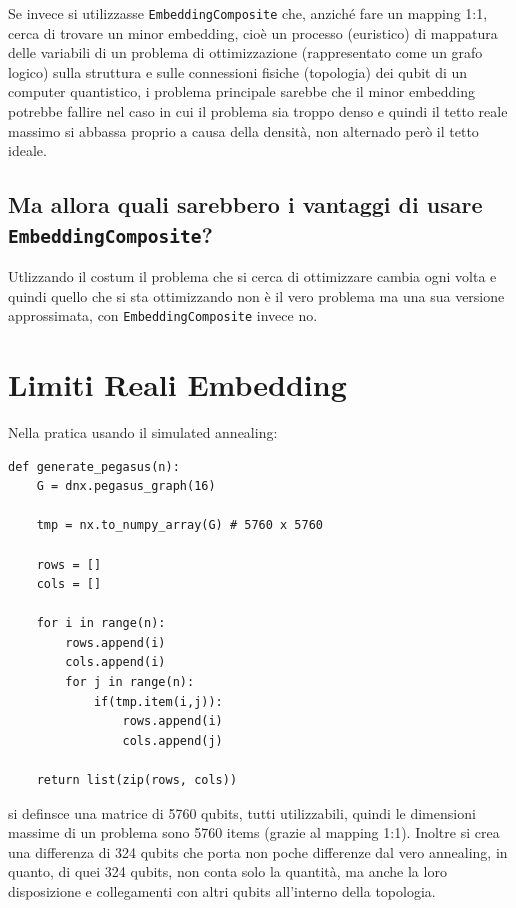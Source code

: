 \documentclass[12pt, letterpaper]{article}
\begin{document}
Se invece si utilizzasse \texttt{EmbeddingComposite} che, anziché fare un mapping 1:1, cerca
di trovare un minor embedding, cioè un processo (euristico) di mappatura delle variabili di un problema 
di ottimizzazione (rappresentato come un grafo logico) sulla struttura e sulle connessioni 
fisiche (topologia) dei qubit di un computer quantistico, i problema principale sarebbe che
il minor embedding potrebbe fallire nel caso in cui il problema sia troppo denso e quindi il tetto
reale massimo si abbassa proprio a causa della densità, non alternado però il tetto ideale.

\subsection{Ma allora quali sarebbero i vantaggi di usare \texttt{EmbeddingComposite}?}
Utlizzando il costum il problema che si cerca di ottimizzare cambia ogni volta
e quindi quello che si sta ottimizzando non è il vero problema ma una sua versione 
approssimata, con \texttt{EmbeddingComposite} invece no. 

\newpage

\section{Limiti Reali Embedding}
Nella pratica usando il simulated annealing:
\begin{lstlisting}[style=coolpython]
def generate_pegasus(n):
    G = dnx.pegasus_graph(16)

    tmp = nx.to_numpy_array(G) # 5760 x 5760
    
    rows = []
    cols = []
        
    for i in range(n):
        rows.append(i)
        cols.append(i)
        for j in range(n):
            if(tmp.item(i,j)):
                rows.append(i)
                cols.append(j)
    
    return list(zip(rows, cols))
\end{lstlisting}
si definsce una matrice di 5760 qubits, tutti utilizzabili, quindi le dimensioni massime
di un problema sono 5760 items (grazie al mapping 1:1). Inoltre si crea una differenza di
324 qubits che porta non poche differenze dal vero annealing, in quanto, di quei 324 qubits,
non conta solo la quantità, ma anche la loro disposizione e collegamenti con altri qubits
all'interno della topologia.
\end{document}
